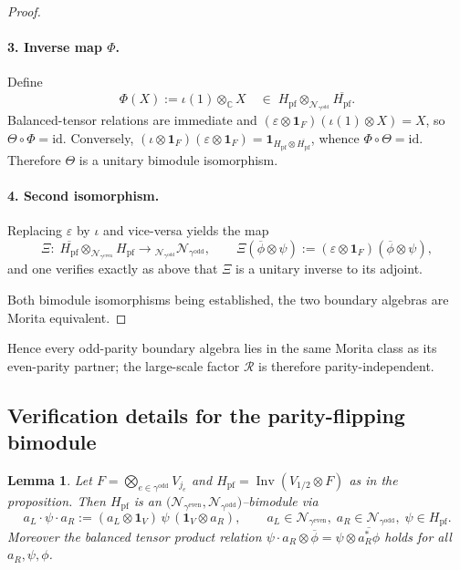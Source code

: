 \documentclass[11pt]{article}
\newtheorem{lemma}{Lemma}[section]
\begin{document}
\begin{proof}
\paragraph{3. Inverse map $\Phi$.}
Define
\[
  \Phi(X):=\iota(1)\otimes_{\mathbb C} X
  \quad\in\;
  H_{\mathrm{pf}}\!\otimes_{\mathcal N_{\gamma^{\mathrm{odd}}}}
  \overline{H_{\mathrm{pf}}}.
\]
Balanced-tensor relations are immediate and
$(\varepsilon\!\otimes\!\mathbf1_F)(\iota(1)\otimes X)=X$,
so $\Theta\!\circ\!\Phi=\mathrm{id}$.
Conversely,
$(\iota\!\otimes\!\mathbf1_F)(\varepsilon\!\otimes\!\mathbf1_F)
  =\mathbf1_{H_{\mathrm{pf}}\otimes\overline{H_{\mathrm{pf}}}}$,
whence $\Phi\!\circ\!\Theta=\mathrm{id}$.
Therefore $\Theta$ is a unitary bimodule isomorphism.

\paragraph{4. Second isomorphism.}
Replacing $\varepsilon$ by $\iota$ and vice-versa yields the map
\[
  \Xi:\;
  \overline{H_{\mathrm{pf}}}\!\otimes_{\mathcal N_{\gamma^{\mathrm{even}}}}
  H_{\mathrm{pf}}
  \longrightarrow
  {}_{\mathcal N_{\gamma^{\mathrm{odd}}}}\mathcal N_{\gamma^{\mathrm{odd}}},
  \qquad
  \Xi(\overline\phi\otimes\psi)
  :=(\varepsilon\!\otimes\!\mathbf1_F)(\overline\phi\otimes\psi),
\]
and one verifies exactly as above that $\Xi$ is a unitary inverse to its
adjoint.

\medskip
Both bimodule isomorphisms being established, the two boundary algebras
are Morita equivalent.
\end{proof}

Hence every odd-parity boundary algebra lies in the same Morita class as its
even-parity partner; the large-scale factor $\mathcal R$ is therefore
parity-independent.

\subsection*{Verification details for the parity-flipping bimodule}

\begin{lemma}\label{lem:bimodule-structure}
Let $F=\bigotimes_{e\in\gamma^{\mathrm{odd}}}V_{j_e}$ and
$H_{\mathrm{pf}}=\operatorname{Inv}(V_{1/2}\otimes F)$ as in the
proposition.
Then $H_{\mathrm{pf}}$ is an
$\bigl(\mathcal N_{\gamma^{\mathrm{even}}},
       \mathcal N_{\gamma^{\mathrm{odd}}}\bigr)$–bimodule via
\[
  a_L\cdot\psi\cdot a_R
  :=(a_L\otimes\mathbf1_V)\,\psi\,(\mathbf1_V\otimes a_R),
  \qquad
  a_L\in\mathcal N_{\gamma^{\mathrm{even}}},
  \;a_R\in\mathcal N_{\gamma^{\mathrm{odd}}},
  \;\psi\in H_{\mathrm{pf}}.
\]
Moreover the balanced tensor product relation
$\psi\cdot a_R\otimes\overline\phi
  =\psi\otimes\overline{a_R^{*}\phi}$
holds for all $a_R,\psi,\phi$.
\end{lemma}
\end{document}
